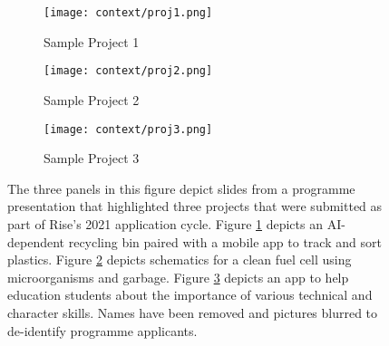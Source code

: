 \begin{figure}[htbp]
    \centering
    \begin{subfigure}{.45\textwidth}
        \centering
        \texttt{[image: context/proj1.png]}
        \caption{Sample Project 1}
        \label{sfig:can}
    \end{subfigure}
    \hfill
    \vspace{1em}
    \begin{subfigure}{.45\textwidth}
        \centering
        \texttt{[image: context/proj2.png]}
        \caption{Sample Project 2}
        \label{sfig:cell}
    \end{subfigure}
    \hfill
    \vspace{1em}
    \begin{subfigure}{.45\textwidth}
        \centering
        \texttt{[image: context/proj3.png]} 
        \caption{Sample Project 3}
        \label{sfig:app}
    \end{subfigure}
    \caption{The three panels in this figure depict slides from a programme presentation that highlighted three projects that were submitted as part of Rise's 2021 application cycle. Figure \ref{sfig:can} depicts an AI-dependent recycling bin paired with a mobile app to track and sort plastics. Figure \ref{sfig:cell} depicts schematics for a clean fuel cell using microorganisms and garbage. Figure \ref{sfig:app} depicts an app to help education students about the importance of various technical and character skills. Names have been removed and pictures blurred to de-identify programme applicants.}
    \label{fig:example_projects}
\end{figure}

